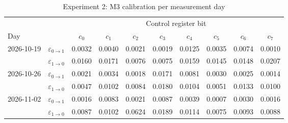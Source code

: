 \begin{table}[htbp]
\centering
\setlength{\tabcolsep}{4pt}
\caption{Experiment 2: M3 calibration per measurement day}
\label{tab:exp2_readout}
\begin{tabular*}{\textwidth}{@{\extracolsep{\fill}}ll*{8}{c}@{}}
\toprule
 & & \multicolumn{8}{c}{Control register bit} \\
\cmidrule(l){3-10}
Day & & $c_0$ & $c_1$ & $c_2$ & $c_3$ & $c_4$ & $c_5$ & $c_6$ & $c_7$ \\
\midrule
2026-10-19 & $\varepsilon_{0\to1}$ & 0.0032 & 0.0040 & 0.0021 & 0.0019 & 0.0125 & 0.0035 & 0.0074 & 0.0010 \\
 & $\varepsilon_{1\to0}$ & 0.0160 & 0.0171 & 0.0076 & 0.0075 & 0.0159 & 0.0145 & 0.0148 & 0.0207 \\
\midrule
2026-10-26 & $\varepsilon_{0\to1}$ & 0.0021 & 0.0034 & 0.0018 & 0.0171 & 0.0081 & 0.0030 & 0.0025 & 0.0014 \\
 & $\varepsilon_{1\to0}$ & 0.0047 & 0.0102 & 0.0084 & 0.0180 & 0.0104 & 0.0051 & 0.0133 & 0.0100 \\
\midrule
2026-11-02 & $\varepsilon_{0\to1}$ & 0.0016 & 0.0083 & 0.0021 & 0.0087 & 0.0039 & 0.0007 & 0.0030 & 0.0016 \\
 & $\varepsilon_{1\to0}$ & 0.0087 & 0.0102 & 0.0624 & 0.0189 & 0.0114 & 0.0075 & 0.0093 & 0.0088 \\
\bottomrule
\end{tabular*}
\end{table}
